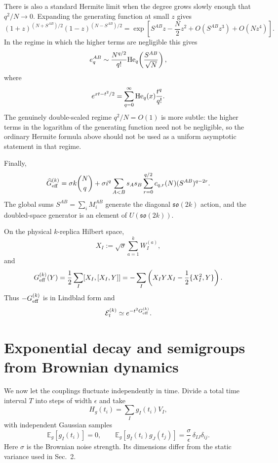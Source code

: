 \documentclass{article}
\theoremstyle{definition}
\begin{document}
There is also a standard Hermite limit when the degree grows slowly enough
that $q^2/N\to0$.  Expanding the generating function at small $z$ gives
\begin{equation}
    (1+z)^{(N+S^{AB})/2}
    (1-z)^{(N-S^{AB})/2}
    =\exp\!\left[
       S^{AB}z-\frac N2z^2
       +O(S^{AB}z^3)+O(Nz^4)
    \right].
\end{equation}
In the regime in which the higher terms are negligible this gives
\begin{equation}
    e_q^{AB}
    \sim\frac{N^{q/2}}{q!}
    {\rm He}_q\!\left(\frac{S^{AB}}{\sqrt N}\right),
\end{equation}
where
\begin{equation}
    e^{xt-t^2/2}
    =\sum_{q=0}^{\infty}{\rm He}_q(x)\frac{t^q}{q!}.
\end{equation}
The genuinely double-scaled regime $q^2/N=O(1)$ is more subtle: the
higher terms in the logarithm of the generating function need not be
negligible, so the ordinary Hermite formula above should not be used as a
uniform asymptotic statement in that regime.

Finally,
\begin{equation}
    \widehat G_{\rm eff}^{(k)}
    =\sigma k\binom Nq
     +\sigma i^q\sum_{A<B}s_As_B
      \sum_{r=0}^{q/2}c_{q,r}(N)(S^{AB})^{q-2r}.
\end{equation}
The global sums $S^{AB}=\sum_iM_i^{AB}$ generate the diagonal
$\mathfrak{so}(2k)$ action, and the doubled-space generator is an element
of $U(\mathfrak{so}(2k))$.

On the physical $k$-replica Hilbert space,
\begin{equation}
    X_I:=\sqrt\sigma\sum_{a=1}^kW_I^{(a)},
\end{equation}
and
\begin{equation}
    G_{\rm eff}^{(k)}(Y)
    =\frac12\sum_I[X_I,[X_I,Y]]
    =-\sum_I\left(X_IYX_I-\frac12\{X_I^2,Y\}\right).
\end{equation}
Thus $-G_{\rm eff}^{(k)}$ is in Lindblad form and
\begin{equation}
    {\cal E}_t^{(k)}\simeq e^{-t^2G_{\rm eff}^{(k)}}.
\end{equation}


\section{Exponential decay and semigroups from Brownian dynamics}

We now let the couplings fluctuate independently in time.  Divide a total
time interval $T$ into steps of width $\epsilon$ and take
\begin{equation}
    H_g(t_i)=\sum_I g_I(t_i)V_I,
\end{equation}
with independent Gaussian samples
\begin{equation}
    \mathbb E_g[g_I(t_i)]=0,
    \qquad
    \mathbb E_g[g_I(t_i)g_J(t_j)]
    =\frac{\sigma}{\epsilon}\,
     \delta_{IJ}\delta_{ij}.
\end{equation}
Here $\sigma$ is the Brownian noise strength.  Its dimensions differ from
the static variance used in Sec.~2.
\end{document}
